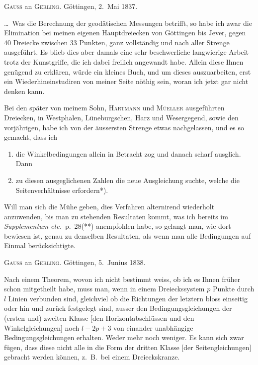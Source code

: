 \documentclass[12pt,a4paper]{article}
\theoremstyle{plain}
\theoremstyle{definition}
\theoremstyle{remark}
\begin{document}
\bigskip\noindent
\textsc{Gauss} an \textsc{Gerling}. G\"ottingen, 2.\ Mai 1837.

\ldots\ Was die Berechnung der geod\"atischen Messungen betrifft, so habe ich zwar die Elimination bei meinen eigenen Hauptdreiecken von G\"ottingen bis Jever, gegen 40 Dreiecke zwischen 33 Punkten, ganz vollst\"andig und nach aller Strenge ausgef\"uhrt. Es blieb dies aber damals eine sehr beschwerliche langwierige Arbeit trotz der Kunstgriffe, die ich dabei freilich angewandt habe. Allein diese Ihnen gen\"ugend zu erkl\"aren, w\"urde ein kleines Buch, und um dieses auszuarbeiten, erst ein Wiederhineinstudiren von meiner Seite n\"othig sein, woran ich jetzt gar nicht denken kann.

Bei den sp\"ater von meinem Sohn, \textsc{Hartmann} und \textsc{M\"ueller} ausgef\"uhrten Dreiecken, in Westphalen, L\"uneburgschen, Harz und Wesergegend, sowie den vorj\"ahrigen, habe ich von der \"aussersten Strenge etwas nachgelassen, und es so gemacht, dass ich
\begin{enumerate}[label=\arabic*)]
\item die Winkelbedingungen allein in Betracht zog und danach scharf ausglich. Dann
\item zu diesen ausgeglichenen Zahlen die neue Ausgleichung suchte, welche die Seitenverh\"altnisse erfordern*).
\end{enumerate}
Will man sich die M\"uhe geben, dies Verfahren alternirend wiederholt anzuwenden, bis man zu stehenden Resultaten kommt, was ich bereits im \textit{Supplementum etc.}\ p.\ 28(**) anempfohlen habe, so gelangt man, wie dort bewiesen ist, genau zu denselben Resultaten, als wenn man alle Bedingungen auf Einmal ber\"ucksichtigte.

\medskip\noindent
\textsc{Gauss} an \textsc{Gerling}. G\"ottingen, 5.\ Junius 1838.

Nach einem Theorem, wovon ich nicht bestimmt weiss, ob ich es Ihnen fr\"uher schon mitgetheilt habe, muss man, wenn in einem Dreieckssystem $p$ Punkte durch $l$ Linien verbunden sind, gleichviel ob die Richtungen der letztern bloss einseitig oder hin und zur\"uck festgelegt sind, ausser den Bedingungsgleichungen der (ersten und) zweiten Klasse [den Horizontabschl\"ussen und den Winkelgleichungen] noch $l - 2p + 3$ von einander unabh\"angige Bedingungsgleichungen erhalten. Weder mehr noch weniger. Es kann sich zwar f\"ugen, dass diese nicht alle in die Form der dritten Klasse [der Seitengleichungen] gebracht werden k\"onnen, z.\ B.\ bei einem Dreieckskranze.
\end{document}

